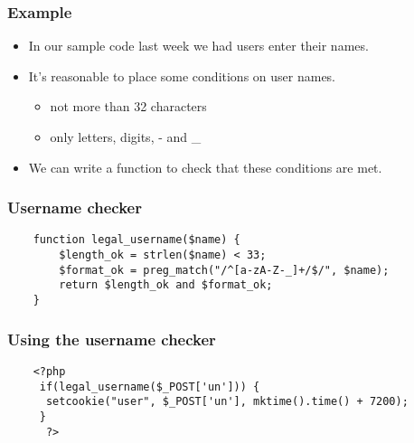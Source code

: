 \documentclass[10pt]{beamer}
\begin{document}
\begin{frame}
	\frametitle{Example}
	\begin{itemize}
		\item In our sample code last week we had users enter
			their names.
		\item It's reasonable to place some conditions on user names.
			\begin{itemize}
				\item not more than 32 characters
				\item only letters, digits, - and \_
			\end{itemize}
		\item We can write a function to check that these
			conditions are met.
	\end{itemize}
\end{frame}

\begin{frame}[fragile]
	\frametitle{Username checker}

	\begin{verbatim}
    function legal_username($name) {
        $length_ok = strlen($name) < 33;
        $format_ok = preg_match("/^[a-zA-Z-_]+/$/", $name);
        return $length_ok and $format_ok;
    }
	\end{verbatim}
\end{frame}
\begin{frame}[fragile]
	\frametitle{Using the username checker}

	\begin{verbatim}
    <?php 
     if(legal_username($_POST['un'])) {
      setcookie("user", $_POST['un'], mktime().time() + 7200);
     }
      ?>

	\end{verbatim}
\end{frame}
\end{document}
